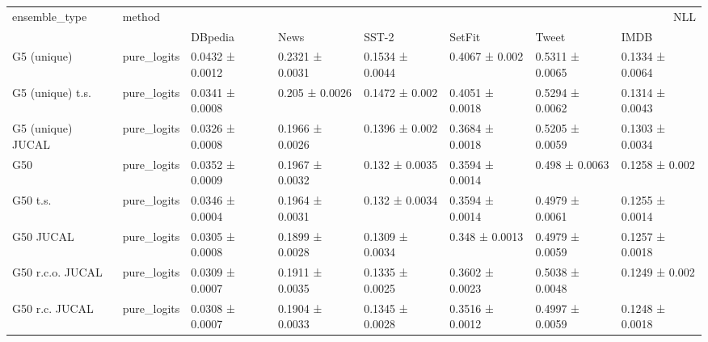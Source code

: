 \begin{tabular}{llllllll}
\toprule
ensemble_type & method & \multicolumn{6}{r}{NLL} \\
 &  & DBpedia & News & SST-2 & SetFit & Tweet & IMDB \\
\midrule
G5 (unique) & pure_logits & 0.0432 ± 0.0012 & 0.2321 ± 0.0031 & 0.1534 ± 0.0044 & 0.4067 ± 0.002 & 0.5311 ± 0.0065 & 0.1334 ± 0.0064 \\
G5 (unique) t.s. & pure_logits & 0.0341 ± 0.0008 & 0.205 ± 0.0026 & 0.1472 ± 0.002 & 0.4051 ± 0.0018 & 0.5294 ± 0.0062 & 0.1314 ± 0.0043 \\
G5 (unique) JUCAL & pure_logits & 0.0326 ± 0.0008 & 0.1966 ± 0.0026 & 0.1396 ± 0.002 & 0.3684 ± 0.0018 & 0.5205 ± 0.0059 & 0.1303 ± 0.0034 \\
G50 & pure_logits & 0.0352 ± 0.0009 & 0.1967 ± 0.0032 & 0.132 ± 0.0035 & 0.3594 ± 0.0014 & 0.498 ± 0.0063 & 0.1258 ± 0.002 \\
G50 t.s. & pure_logits & 0.0346 ± 0.0004 & 0.1964 ± 0.0031 & 0.132 ± 0.0034 & 0.3594 ± 0.0014 & 0.4979 ± 0.0061 & 0.1255 ± 0.0014 \\
G50 JUCAL & pure_logits & 0.0305 ± 0.0008 & 0.1899 ± 0.0028 & 0.1309 ± 0.0034 & 0.348 ± 0.0013 & 0.4979 ± 0.0059 & 0.1257 ± 0.0018 \\
G50 r.c.o. JUCAL & pure_logits & 0.0309 ± 0.0007 & 0.1911 ± 0.0035 & 0.1335 ± 0.0025 & 0.3602 ± 0.0023 & 0.5038 ± 0.0048 & 0.1249 ± 0.002 \\
G50 r.c. JUCAL & pure_logits & 0.0308 ± 0.0007 & 0.1904 ± 0.0033 & 0.1345 ± 0.0028 & 0.3516 ± 0.0012 & 0.4997 ± 0.0059 & 0.1248 ± 0.0018 \\
\bottomrule
\end{tabular}
